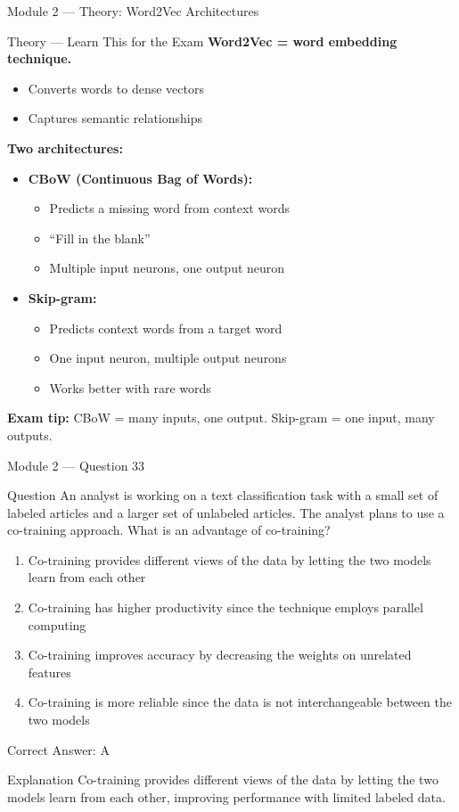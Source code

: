 \documentclass[aspectratio=169,10pt]{beamer}
\newcommand{\question}[1]{%
	\begin{block}{Question}
		#1
	\end{block}
}
\newcommand{\options}[4]{%
	\begin{enumerate}[label=\Alph*.,leftmargin=*]
		\item #1
		\item #2
		\item #3
		\item #4
	\end{enumerate}
}
\newcommand{\answerbox}[1]{%
	\begin{exampleblock}{Correct Answer: #1}
	\end{exampleblock}
}
\newcommand{\explain}[1]{%
	\begin{block}{Explanation}
		\small #1
	\end{block}
}
\newcommand{\theory}[1]{%
	\begin{block}{Theory --- Learn This for the Exam}
		\small #1
	\end{block}
}
\begin{document}
	\begin{frame}{Module 2 --- Theory: Word2Vec Architectures}
		\theory{
			\textbf{Word2Vec = word embedding technique.}
			\begin{itemize}
				\item Converts words to dense vectors
				\item Captures semantic relationships
			\end{itemize}
			\textbf{Two architectures:}
			\begin{itemize}
				\item \textbf{CBoW (Continuous Bag of Words):}
				\begin{itemize}
					\item Predicts a missing word from context words
					\item ``Fill in the blank''
					\item Multiple input neurons, one output neuron
				\end{itemize}
				\item \textbf{Skip-gram:}
				\begin{itemize}
					\item Predicts context words from a target word
					\item One input neuron, multiple output neurons
					\item Works better with rare words
				\end{itemize}
			\end{itemize}
			\textbf{Exam tip:} CBoW = many inputs, one output. Skip-gram = one input, many outputs.
		}
	\end{frame}
	
	\begin{frame}{Module 2 --- Question 33}
		\question{An analyst is working on a text classification task with a small set of labeled articles and a larger set of unlabeled articles. The analyst plans to use a co-training approach. What is an advantage of co-training?}
		\options{Co-training provides different views of the data by letting the two models learn from each other}{Co-training has higher productivity since the technique employs parallel computing}{Co-training improves accuracy by decreasing the weights on unrelated features}{Co-training is more reliable since the data is not interchangeable between the two models}
		\answerbox{A}
		\explain{Co-training provides different views of the data by letting the two models learn from each other, improving performance with limited labeled data.}
	\end{frame}
	
\end{document}
